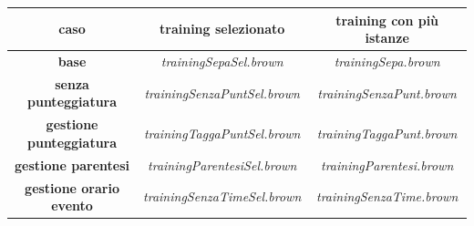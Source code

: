 \documentclass[a4paper]{report}
\begin{document}
\begin{center}
\begin{tabular}{|c|c|c|}
\hline
caso & training selezionato & training con più istanze\\
\hline
\textbf{base} & \textit{trainingSepaSel.brown} & \textit{trainingSepa.brown}\\
\hline
\textbf{senza punteggiatura} & \textit{trainingSenzaPuntSel.brown} & \textit{trainingSenzaPunt.brown}\\
\hline
\textbf{gestione punteggiatura} & \textit{trainingTaggaPuntSel.brown} & \textit{trainingTaggaPunt.brown}\\
\hline
\textbf{gestione parentesi} & \textit{trainingParentesiSel.brown} & \textit{trainingParentesi.brown}\\
\hline
\textbf{gestione orario evento} & \textit{trainingSenzaTimeSel.brown} & \textit{trainingSenzaTime.brown}\\
\hline
\end{tabular}
\end{center}
\end{document}
